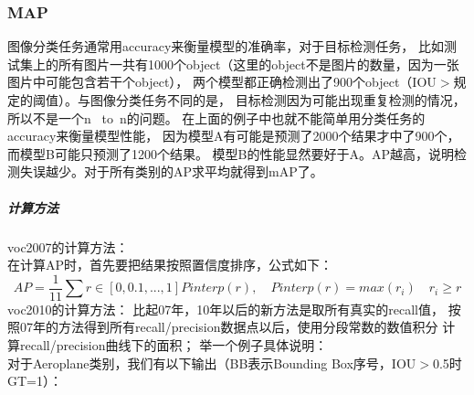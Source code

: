 \documentclass{article}
\begin{document}
\begin{CJK}{UTF8}{gbsn}
\subsubsection{MAP}
图像分类任务通常用accuracy来衡量模型的准确率，对于目标检测任务，
比如测试集上的所有图片一共有1000个object（这里的object不是图片的数量，因为一张图片中可能包含若干个object），
两个模型都正确检测出了900个object（IOU$>$规定的阈值）。与图像分类任务不同的是，
目标检测因为可能出现重复检测的情况，所以不是一个n \ to\  n的问题。
在上面的例子中也就不能简单用分类任务的accuracy来衡量模型性能，
因为模型A有可能是预测了2000个结果才中了900个，而模型B可能只预测了1200个结果。
模型B的性能显然要好于A。AP越高，说明检测失误越少。对于所有类别的AP求平均就得到mAP了。
\subparagraph{计算方法\\}
voc2007的计算方法：\\
在计算AP时，首先要把结果按照置信度排序，公式如下：\\
\begin{equation}
    AP = \frac{1}{11}\sum r \in [0,0.1,...,1]Pinterp(r),\quad Pinterp(r)=max({r_i}) \quad r_i\ge r
\end{equation}
voc2010的计算方法：
比起07年，10年以后的新方法是取所有真实的recall值，
按照07年的方法得到所有recall/precision数据点以后，使用分段常数的数值积分
计算recall/precision曲线下的面积；
举一个例子具体说明：\\
对于Aeroplane类别，我们有以下输出（BB表示Bounding Box序号，IOU$>$0.5时GT=1）：\\


\end{CJK}
\end{document}
